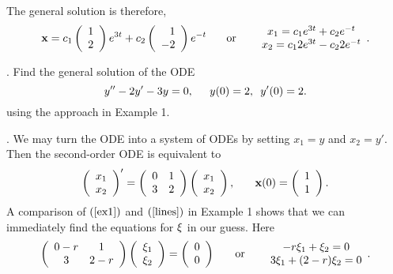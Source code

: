 \documentclass[leqno,DIV=calc,paper=a4,fontsize=11pt]{article}
\theoremstyle{definition}
\theoremstyle{plain}
\theoremstyle{remark}
\newcommand{\R}[1]{$(\ref{#1})$}
\begin{document}
The general solution is therefore,
\[
{\bf x}=c_1\left(\begin{array}{c}1\\2\end{array}\right)e^{3t}
+c_2\left(\begin{array}{r}1\\-2\end{array}\right)e^{-t}
\hspace{.25in} \mbox{or} \hspace{.25in}
\begin{array}{c}x_1=c_1e^{3t}+c_2e^{-t}\\x_2=c_12e^{3t}-c_22e^{-t}\end{array}.
\]

\pagebreak
{}. Find the general solution of the ODE
\[
y''-2y'-3y=0, \hspace{.2in} y(0)=2,\,\,\, y'(0)=2.
\]
using the approach in Example 1.

\vspace{.1in}
. We may turn the ODE into a system of ODEs by
setting $x_1=y$ and $x_2=y'$. Then the second-order ODE is equivalent
to
\[
\left(\begin{array}{c}x_1\\ x_2\end{array}\right)'=
\left(
\begin{array}{cc}0&1\\3&2\end{array}\right)
\left(\begin{array}{c}x_1\\x_2\end{array}\right),\hspace{.25in}
{\bf x}(0)=\left(\begin{array}{c}1\\1\end{array}\right).
\]
A comparison of \R{ex1} and \R{lines} in Example 1
shows that we can immediately find the equations for
${\bf \xi}$ in our guess. Here
\[
\left(
\begin{array}{cc}0-r&1\\3&2-r\end{array}
\right)\left(\begin{array}{c}\xi_1\\ \xi_2\end{array}\right)=
\left(\begin{array}{c}0\\0\end{array}\right)
\hspace{.25in} \mbox{or} \hspace{.25in}
\begin{array}{cc}-r\xi_1+\xi_2=0\\3\xi_1+(2-r)\xi_2=0\end{array}.
\]
\end{document}
